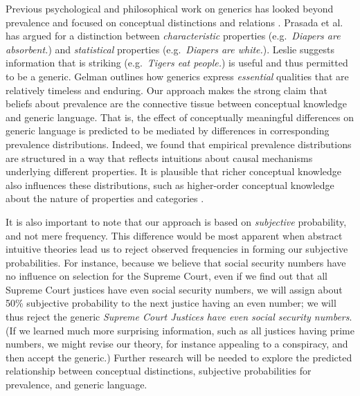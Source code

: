 \documentclass[12pt,letterpaper]{article}
\begin{document}
Previous psychological and philosophical work on generics has looked beyond prevalence and focused on conceptual distinctions and relations \cite{Gelman2005,Prasada2013,Leslie2007,Leslie2008}. 
Prasada et al. has argued for a distinction between \emph{characteristic} properties (e.g.~\emph{Diapers are absorbent.}) and \emph{statistical} properties (e.g.~\emph{Diapers are white.}).
Leslie suggests information that is striking (e.g.~\emph{Tigers eat people.}) is useful and thus permitted to be a generic.
Gelman outlines how generics express \emph{essential} qualities that are relatively timeless and enduring. %
Our approach makes the strong claim that beliefs about prevalence are the connective tissue between conceptual knowledge and generic language.
That is, the effect of conceptually meaningful differences on generic language is predicted to be mediated by differences in corresponding prevalence distributions.
Indeed, we found that empirical prevalence distributions are structured in a way that reflects intuitions about causal mechanisms underlying different properties.
It is plausible that richer conceptual knowledge also influences these distributions, such as higher-order conceptual knowledge about the nature of properties and categories \cite{Gelman2005,Keil1992}. 

It is also important to note that our approach is based on \emph{subjective} probability, and not mere frequency.
This difference would be most apparent when abstract intuitive theories lead us to reject observed frequencies in forming our subjective probabilities. For instance, because we believe that social security numbers have no influence on selection for the Supreme Court, even if we find out that all Supreme Court justices have even social security numbers, we will assign about 50\% subjective probability to the next justice having an even number; we will thus reject the generic \emph{Supreme Court Justices have even social security numbers}. (If we learned much more surprising information, such as all justices having prime numbers, we might revise our theory, for instance appealing to a conspiracy, and then accept the generic.)
Further research will be needed to explore the predicted relationship between conceptual distinctions, subjective probabilities for prevalence, and generic language.
\end{document}

